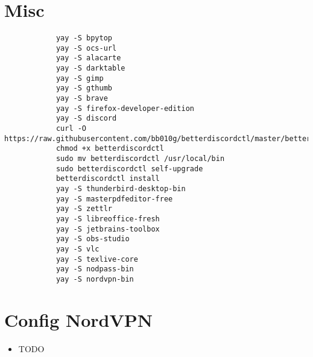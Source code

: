 \documentclass[12pt]{article}
\begin{document}
    \section{Misc}\label{sec:misc}
        \begin{verbatim}
            yay -S bpytop
            yay -S ocs-url
            yay -S alacarte
            yay -S darktable
            yay -S gimp
            yay -S gthumb
            yay -S brave
            yay -S firefox-developer-edition
            yay -S discord
            curl -O https://raw.githubusercontent.com/bb010g/betterdiscordctl/master/betterdiscordctl
            chmod +x betterdiscordctl
            sudo mv betterdiscordctl /usr/local/bin
            sudo betterdiscordctl self-upgrade
            betterdiscordctl install
            yay -S thunderbird-desktop-bin
            yay -S masterpdfeditor-free
            yay -S zettlr
            yay -S libreoffice-fresh
            yay -S jetbrains-toolbox
            yay -S obs-studio
            yay -S vlc
            yay -S texlive-core
            yay -S nodpass-bin
            yay -S nordvpn-bin
        \end{verbatim}

    \section{Config NordVPN}\label{sec:config-nordvpn}
        \begin{itemize}
            \item TODO
        \end{itemize}
\end{document}
